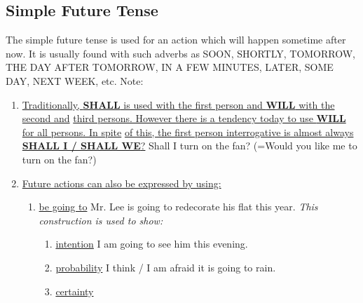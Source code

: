\subsection{Simple Future Tense}
The simple future tense is used for an action which will happen sometime after
now. It is usually found with such adverbs as SOON, SHORTLY, TOMORROW, THE DAY
AFTER TOMORROW, IN A FEW MINUTES, LATER, SOME DAY, NEXT WEEK, etc.
\newline
\newline
Note:
\begin{enumerate}
    \item \underline{Traditionally, {\bf SHALL} is used with the first person
        and {\bf WILL} with the second and}
        \newline
        \underline{third persons. However there is a tendency today to use
        {\bf WILL} for all persons. In spite}
        \newline
        \underline{of this, the first person
        interrogative is almost always {\bf SHALL I / SHALL WE}?}
        \newline
        \newline
        Shall I turn on the fan? (=Would you like me to turn on the fan?)
    \item \underline{Future actions can also be expressed by using:}
        \newline
        \newline
        \begin{enumerate}
            \item \underline{be going to}
                \newline
                Mr. Lee is going to redecorate his flat this year.
                \newline
                \newline
                {\it This construction is used to show:}
                \begin{enumerate}
                    \item \underline{intention}
                        \newline
                        I am going to see him this evening.
                    \item \underline{probability}
                        \newline
                        I think / I am afraid it is going to rain.
                    \item \underline{certainty}
                        \newline

\end{enumerate}
\end{enumerate}
\end{enumerate}
